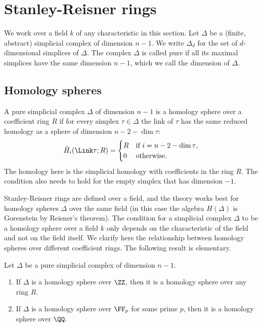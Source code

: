 \section{Stanley-Reisner rings}
\label{sec-SR}

We work over a field $k$ of any characteristic in this section.
Let $\Delta$ be a (finite, abstract) simplicial complex of dimension $n-1$. We write $\Delta_d$ for the set of $d$-dimensional simplices of $\Delta$. The complex $\Delta$ is called pure if all its maximal simplices have the same dimension $n-1$, which we call the dimension of $\Delta$.

\subsection{Homology spheres} A pure simplicial complex $\Delta$ of dimension $n-1$ is a homology sphere over a coefficient ring $R$ if for every simplex $\tau \in \Delta$ the link of $\tau$ has the same reduced homology as a sphere of dimension $n-2-\dim \tau$:
\[ \tilde{H}_i (\Link\tau; R) = \begin{cases} R & \text{if $i=n-2-\dim\tau$},\\
0 & \text{otherwise.} \end{cases}
\]
 The homology here is the simplicial homology with coefficients in the ring $R$. The condition also needs to hold for the empty simplex that has dimension $-1$. 
 
Stanley-Reisner rings are defined over a field, and the theory works best for homology spheres $\Delta$ over the same field (in this case the algebra $H(\Delta)$ is Gorenstein by Reisner's theorem). The condition for a simplicial complex $\Delta$ to be a homology sphere over a field $k$ only depends on the characteristic of the field and not on the field itself. We clarify here the relationship between homology spheres over different coefficient rings. The following result is elementary.

\begin{lemma}
Let $\Delta$ be a pure simplicial complex of dimension $n-1$. 
\begin{enumerate}
\item If $\Delta$ is a homology sphere over $\ZZ$, then it is a homology sphere over any ring $R$.
\item If $\Delta$ is a homology sphere over $\FF_p$ for some prime $p$, then it is a homology sphere over $\QQ$.
\end{enumerate}
\end{lemma}

